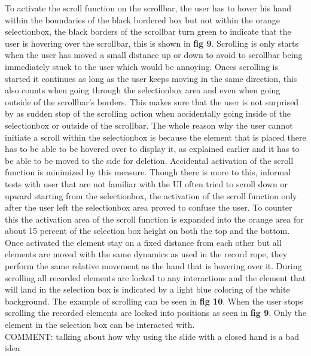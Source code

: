 To activate the scroll function on the scrollbar, the user has to hover his hand within the boundaries of the black bordered box but not within the orange selectionbox, the black borders of the scrollbar turn green to indicate that the user is hovering over the scrollbar, this is shown in \textbf{ fig 9}. Scrolling is only starts when the user has moved a small distance up or down to avoid to scrollbar being immediately stuck to the user which would be annoying. Onces scrolling is started it continues as long as the user keeps moving in the same direction, this also counts when going through the selectionbox area and even when going outside of the scrollbar's borders. This makes sure that the user is not surprised by as sudden stop of the scrolling action when accidentally going inside of the selectionbox or outside of the scrollbar. The whole reason why the user cannot initiate a scroll within the selectionbox is because the element that is placed there has to be able to be hovered over to display it, as explained earlier and it has to be able to be moved to the side for deletion. Accidental activation of the scroll function is minimized by this measure. Though there is more to this, informal tests with user that are not familiar with the UI often tried to scroll down or upward starting from the selectionbox, the activation of the scroll function only after the user left the selectionbox area proved to confuse the user. To counter this the activation area of the scroll function is expanded into the orange area for about 15 percent of the selection box height on both the top and the bottom. Once activated the element stay on a fixed distance from each other but all elements are moved with the same dynamics as used in the record rope, they perform the same relative movement as the hand that is hovering over it. During scrolling all recorded elements are locked to any interactions and the element that will land in the selection box is indicated by a light blue coloring of the white background. The example of scrolling can be seen in \textbf{ fig 10}. When the user stops scrolling the recorded elements are locked into positions as seen in \textbf{ fig 9}. Only the element in the selection box can be interacted with.\\

{\large COMMENT: talking about how why using the slide with a closed hand is a bad idea} \\

